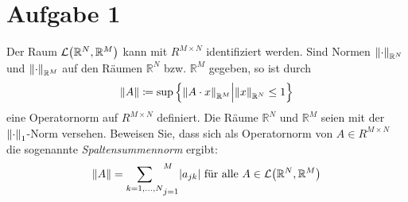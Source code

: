 \documentclass{scrreprt}
\begin{document}
\section*{Aufgabe 1} Der Raum $\mathcal{L}\qty(\mathbb{R}^N, \mathbb{R}^M)$ kann mit
$R^{M \times N}$ identifiziert werden.
Sind Normen $\norm{\cdot}_{\mathbb{R}^N}$ und
$\norm{\cdot}_{\mathbb{R}^M}$ auf den Räumen $\mathbb{R}^N$ bzw.
$\mathbb{R}^M$ gegeben, so ist durch
\[
  \norm{A} \coloneqq \sup\qty{ \norm{A \cdot x}_{\mathbb{R}^M} {\Big |} \norm{x}_{\mathbb{R}^N} \leq 1}
\]
eine Operatornorm auf $R^{M \times N}$ definiert.
Die Räume $\mathbb{R}^N$ und $\mathbb{R}^M$ seien mit der $\norm{\cdot}_1$-Norm
versehen.
Beweisen Sie, dass sich als Operatornorm von $A \in R^{M \times N}$ die
sogenannte \textit{Spaltensummennorm} ergibt:
\[
  \norm{A} = \underset{k=1,\ldots,N}\sum_{j=1}^M \abs{a_{jk}} \text{ für alle } A \in \mathcal{L}\qty(\mathbb{R}^N, \mathbb{R}^M)
\]
\end{document}
